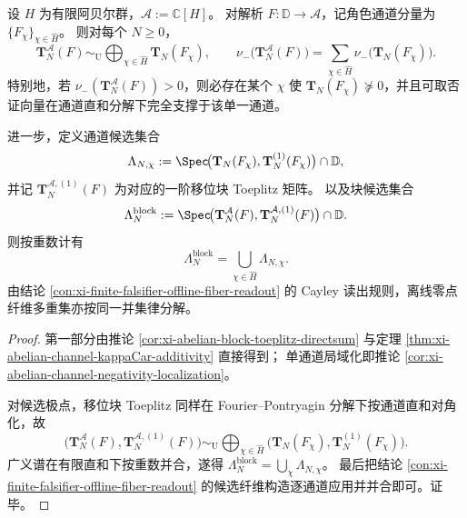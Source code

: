 \begin{proposition}[阿贝尔多通道否证的单通道局域化与候选极点并集定理]\label{prop:xi-abelian-single-channel-localization-and-pencil-union}
设 \(H\) 为有限阿贝尔群，\(\mathcal A:=\mathbb C[H]\)。
对解析 \(F:\mathbb D\to\mathcal A\)，记角色通道分量为 \(\{F_\chi\}_{\chi\in\widehat H}\)。
则对每个 \(N\ge 0\)，
\[
\mathbf T_N^{\mathcal A}(F)\sim_{\mathrm U}\bigoplus_{\chi\in\widehat H}\mathbf T_N(F_\chi),
\qquad
\nu_-\!\bigl(\mathbf T_N^{\mathcal A}(F)\bigr)
=\sum_{\chi\in\widehat H}\nu_-\!\bigl(\mathbf T_N(F_\chi)\bigr).
\]
特别地，若 \(\nu_-(\mathbf T_N^{\mathcal A}(F))>0\)，则必存在某个 \(\chi\) 使 \(\mathbf T_N(F_\chi)\nsucceq 0\)，并且可取否证向量在通道直和分解下完全支撑于该单一通道。
\par
进一步，定义通道候选集合
\[
\Lambda_{N,\chi}
:=\Spec\!\bigl(\mathbf T_N(F_\chi),\mathbf T_N^{(1)}(F_\chi)\bigr)\cap\mathbb D,
\]
并记 \(\mathbf T_N^{\mathcal A,(1)}(F)\) 为对应的一阶移位块 Toeplitz 矩阵。
以及块候选集合
\[
\Lambda_N^{\mathrm{block}}
:=\Spec\!\bigl(\mathbf T_N^{\mathcal A}(F),\mathbf T_N^{\mathcal A,(1)}(F)\bigr)\cap\mathbb D.
\]
则按重数计有
\[
\Lambda_N^{\mathrm{block}}=\bigcup_{\chi\in\widehat H}\Lambda_{N,\chi}.
\]
由结论 \ref{con:xi-finite-falsifier-offline-fiber-readout} 的 Cayley 读出规则，离线零点纤维多重集亦按同一并集律分解。
\end{proposition}
\begin{proof}
第一部分由推论 \ref{cor:xi-abelian-block-toeplitz-directsum} 与定理 \ref{thm:xi-abelian-channel-kappaCar-additivity} 直接得到；
单通道局域化即推论 \ref{cor:xi-abelian-channel-negativity-localization}。
\par
对候选极点，移位块 Toeplitz 同样在 Fourier--Pontryagin 分解下按通道直和对角化，故
\[
\bigl(\mathbf T_N^{\mathcal A}(F),\mathbf T_N^{\mathcal A,(1)}(F)\bigr)
\sim_{\mathrm U}
\bigoplus_{\chi\in\widehat H}
\bigl(\mathbf T_N(F_\chi),\mathbf T_N^{(1)}(F_\chi)\bigr).
\]
广义谱在有限直和下按重数并合，遂得
\(\Lambda_N^{\mathrm{block}}=\bigcup_\chi \Lambda_{N,\chi}\)。
最后把结论 \ref{con:xi-finite-falsifier-offline-fiber-readout} 的候选纤维构造逐通道应用并并合即可。证毕。
\end{proof}


